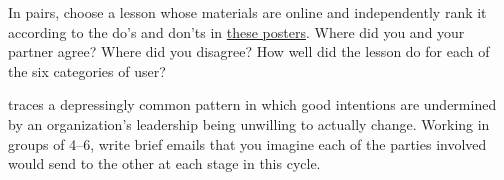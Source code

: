 
In pairs, choose a lesson whose materials are online and independently
rank it according to the do's and don'ts in
\href{https://accessibility.blog.gov.uk/2016/09/02/dos-and-donts-on-designing-for-accessibility/}{these
  posters}.  Where did you and your partner agree?  Where did you
disagree?  How well did the lesson do for each of the six categories
of user?


\cite{Coco2018} traces a depressingly common pattern in which good
intentions are undermined by an organization's leadership being
unwilling to actually change.  Working in groups of 4--6, write brief
emails that you imagine each of the parties involved would send to the
other at each stage in this cycle.
